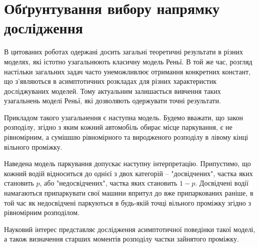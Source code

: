 \section{Обґрунтування вибору напрямку дослідження}

В цитованих роботах одержані досить загальні теоретичні результати в різних моделях, які істотно узагальнюють класичну модель Реньї. В той же час, розгляд настільки загальних задач часто унеможливлює отримання конкретних констант, що з’являються в асимптотичних розкладах для різних характеристик досліджуваних моделей. Тому актуальним залишається вивчення таких узагальнень моделі Реньї, які дозволяють одержувати точні результати.

Прикладом такого узагальнення є наступна модель. Будемо вважати, що закон розподілу, згідно з яким кожний автомобіль обирає місце паркування, є не рівномірним, а сумішшю рівномірного та виродженого розподілу в лівому кінці вільного проміжку.

Наведена модель паркування допускає наступну інтерпретацію. Припустимо, що кожний водій відноситься до однієї з двох категорій – "досвідчених", частка яких становить $p$, або "недосвідчених", частка яких становить $1 - p$. Досвідчені водії намагаються припаркувати свої машини впритул до вже припаркованих раніше, в той час як недосвідчені паркуються в будь-якій точці вільного проміжку згідно з рівномірним розподілом.

Науковий інтерес представляє дослідження асимптотичної поведінки такої моделі, а також визначення старших моментів розподілу частки зайнятого проміжку.
